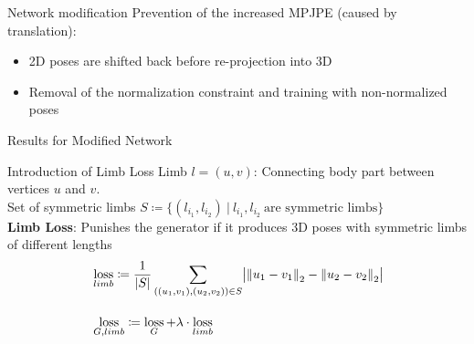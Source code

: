 \documentclass[8pt]{beamer}
\DeclareMathOperator{\loss}{loss}
\begin{document}
	\begin{frame}{Network modification}
		Prevention of the increased MPJPE (caused by translation):
		\begin{itemize}
			\item 2D poses are shifted back before re-projection into 3D
			\item Removal of the normalization constraint and training with non-normalized poses
		\end{itemize}
		\begin{figure}
			\centering
		\end{figure}
	\end{frame}

	\begin{frame}{Results for Modified Network}
		
	\end{frame}

	\begin{frame}[t]{Introduction of Limb Loss}
		\vfill
		Limb $l = (u, v)$: Connecting body part between vertices $u$ and $v$.\\
		Set of symmetric limbs $S \coloneqq \{(l_{i_1}, l_{i_2})~|~ l_{i_1}, l_{i_2}\ \text{are symmetric limbs} \}$\\
		\vfill
		\textbf{Limb Loss}:
		Punishes the generator if it produces 3D poses with symmetric limbs of different lengths
		\vspace{2em}
		\begin{align*}
		&\loss_{limb} \coloneqq \frac{1}{|S|}\sum_{((u_1, v_1), (u_2, v_2)) \in S} \bigl\lvert \norm{u_1 - v_1}_2 - \norm{u_2 - v_2}_2 \bigr\rvert\\[1em]
		&\loss_{G, limb} \coloneqq \loss_G + \lambda \cdot \loss_{limb}
		\end{align*}	
		\vfill	
	\end{frame}
	
\end{document}

